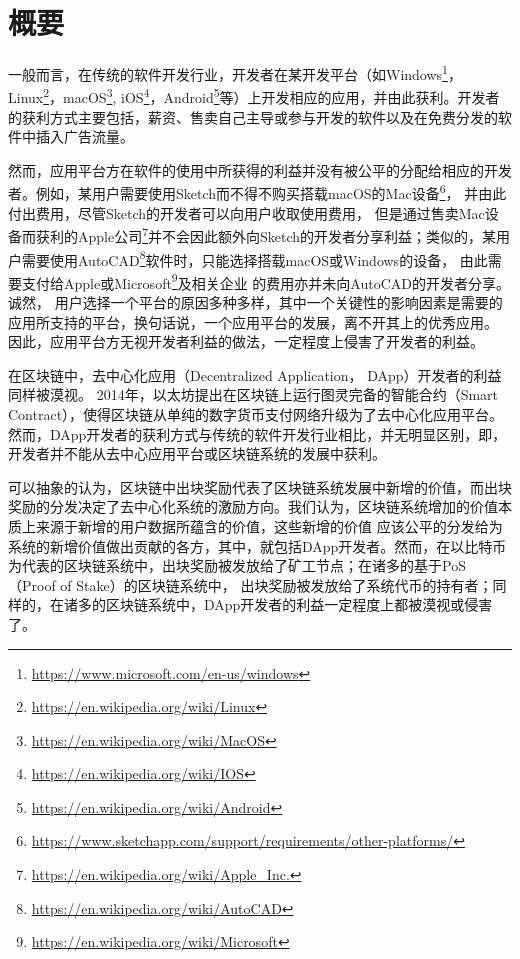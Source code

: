 \section{概要}


一般而言，在传统的软件开发行业，开发者在某开发平台（如Windows\footnote{\url{https://www.microsoft.com/en-us/windows}}，Linux\footnote{\url{https://en.wikipedia.org/wiki/Linux}}，macOS\footnote{\url{https://en.wikipedia.org/wiki/MacOS}}, iOS\footnote{\url{https://en.wikipedia.org/wiki/IOS}}，Android\footnote{\url{https://en.wikipedia.org/wiki/Android}}等）上开发相应的应用，并由此获利。开发者的获利方式主要包括，薪资、售卖自己主导或参与开发的软件以及在免费分发的软件中插入广告流量。

然而，应用平台方在软件的使用中所获得的利益并没有被公平的分配给相应的开发者。例如，某用户需要使用Sketch而不得不购买搭载macOS的Mac设备\footnote{\url{https://www.sketchapp.com/support/requirements/other-platforms/}}，
并由此付出费用，尽管Sketch的开发者可以向用户收取使用费用，
但是通过售卖Mac设备而获利的Apple公司\footnote{\url{https://en.wikipedia.org/wiki/Apple_Inc.}}并不会因此额外向Sketch的开发者分享利益；类似的，某用户需要使用AutoCAD\footnote{\url{https://en.wikipedia.org/wiki/AutoCAD}}软件时，只能选择搭载macOS或Windows的设备，
由此需要支付给Apple或Microsoft\footnote{\url{https://en.wikipedia.org/wiki/Microsoft}}及相关企业
的费用亦并未向AutoCAD的开发者分享。
诚然， 用户选择一个平台的原因多种多样，其中一个关键性的影响因素是需要的应用所支持的平台，换句话说，一个应用平台的发展，离不开其上的优秀应用。
因此，应用平台方无视开发者利益的做法，一定程度上侵害了开发者的利益。

在区块链中，去中心化应用（Decentralized Application， DApp）开发者的利益同样被漠视。
2014年，以太坊提出在区块链上运行图灵完备的智能合约（Smart Contract），使得区块链从单纯的数字货币支付网络升级为了去中心化应用平台。
然而，DApp开发者的获利方式与传统的软件开发行业相比，并无明显区别，即，开发者并不能从去中心应用平台或区块链系统的发展中获利。

可以抽象的认为，区块链中出块奖励代表了区块链系统发展中新增的价值，而出块奖励的分发决定了去中心化系统的激励方向。我们认为，区块链系统增加的价值本质上来源于新增的用户数据所蕴含的价值，这些新增的价值
应该公平的分发给为系统的新增价值做出贡献的各方，其中，就包括DApp开发者。然而，在以比特币为代表的区块链系统中，出块奖励被发放给了矿工节点；在诸多的基于PoS（Proof of Stake）的区块链系统中，
出块奖励被发放给了系统代币的持有者；同样的，在诸多的区块链系统中，DApp开发者的利益一定程度上都被漠视或侵害了。

